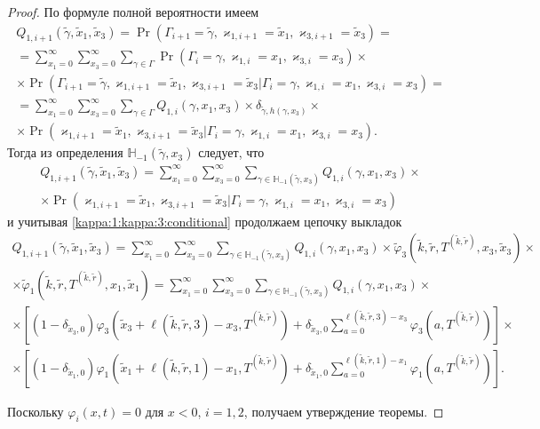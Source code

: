 \documentclass[a4paper,12pt,russian]{extarticle}
\begin{document}
\begin{proof}
По формуле полной вероятности имеем
\begin{multline*}
Q_{1,i+1}(\tilde{\gamma},\tilde{x}_1,\tilde{x}_3) = \Pr(\Gamma_{i+1}=\tilde{\gamma}, \varkappa_{1,i+1}=\tilde{x}_1, \varkappa_{3,i+1}=\tilde{x}_3) = \\
= \sum_{x_1=0}^{\infty}\sum_{x_3=0}^{\infty}\sum_{\gamma \in \Gamma} \Pr(\Gamma_{i}=\gamma, \varkappa_{1,i}=x_1, \varkappa_{3,i}=x_3) \times \\ \times  \Pr(\Gamma_{i+1}=\tilde{\gamma}, \varkappa_{1,i+1}=\tilde{x}_1, \varkappa_{3,i+1}=\tilde{x}_3 | \Gamma_{i}=\gamma,\varkappa_{1,i}=x_1, \varkappa_{3,i}=x_3) =  \\ 
=\sum_{x_1=0}^{\infty} \sum_{x_3=0}^{\infty}\sum_{\gamma \in \Gamma} Q_{1,i}(\gamma, x_1, x_3) \times \delta_{\tilde{\gamma},h(\gamma,x_3)}\times \\ \times
\Pr(\varkappa_{1,i+1}=\tilde{x}_1 , \varkappa_{3,i+1}=\tilde{x}_3 | \Gamma_{i}=\gamma, \varkappa_{1,i}=x_1, \varkappa_{3,i}=x_3).
\end{multline*}
Тогда из определения $ {\mathbb H}_{-1}(\tilde{\gamma},x_3)$ следует, что 
\begin{multline*}
Q_{1,i+1}(\tilde{\gamma},\tilde{x}_1, \tilde{x}_3) =\sum_{x_1=0}^{\infty} \sum_{x_3=0}^{\infty}\sum_{\gamma \in {\mathbb H}_{-1}(\tilde{\gamma},x_3)} Q_{1,i}(\gamma,x_1, x_3) \times \\ \times 
\Pr(\varkappa_{1,i+1}=\tilde{x}_1, \varkappa_{3,i+1}=\tilde{x}_3 | \Gamma_{i}=\gamma, \varkappa_{1,i}=x_1, \varkappa_{3,i}=x_3)
\end{multline*}
и учитывая \eqref{kappa:1:kappa:3:conditional} продолжаем цепочку выкладок
\begin{multline*}
Q_{1,i+1}(\tilde{\gamma},\tilde{x}_1, \tilde{x}_3)=\sum_{x_1=0}^{\infty} \sum_{x_3=0}^{\infty}\sum_{\gamma \in {\mathbb H}_{-1}(\tilde{\gamma},x_3)} Q_{1,i}(\gamma,x_1,x_3) \times 
\tilde{\varphi}_3(\tilde{k},\tilde{r}, T^{(\tilde{k},\tilde{r})},x_3,\tilde{x}_3) \times \\ \times 
\tilde{\varphi}_1(\tilde{k},\tilde{r}, T^{(\tilde{k},\tilde{r})},x_1,\tilde{x}_1) 
= \sum_{x_1=0}^{\infty} \sum_{x_3=0}^{\infty} \sum_{\gamma \in {\mathbb H}_{-1}(\tilde{\gamma},x_3)} Q_{1,i}(\gamma,x_1, x_3) \times \\ \times
[ (1-\delta_{\tilde{x}_3,0})\varphi_3(\tilde{x}_3 + \ell(\tilde{k},\tilde{r},3) - x_3,T^{(\tilde{k},\tilde{r})}) +\delta_{\tilde{x}_3,0} \sum_{a=0}^{\ell(\tilde{k},\tilde{r},3)-x_3}\varphi_3(a,T^{(\tilde{k},\tilde{r})})] \times \\ 
\times 
[ (1-\delta_{\tilde{x}_1,0})\varphi_1(\tilde{x}_1 + \ell(\tilde{k},\tilde{r},1) - x_1,T^{(\tilde{k},\tilde{r})}) +\delta_{\tilde{x}_1,0} \sum_{a=0}^{\ell(\tilde{k},\tilde{r},1)-x_1}\varphi_1(a,T^{(\tilde{k},\tilde{r})})].
\end{multline*}

Поскольку  $\varphi_i(x,t)=0$ для $x<0$, $i=1,2$, получаем утверждение теоремы.
\end{proof}
\end{document}
